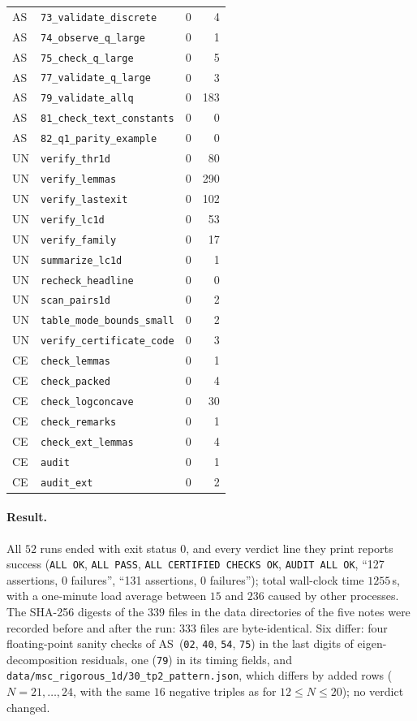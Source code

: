 \documentclass[10pt,a4paper]{article}
\theoremstyle{plain}
\theoremstyle{definition}
\newcommand{\ASY}{\textsf{AS}}
\newcommand{\UNI}{\textsf{UN}}
\newcommand{\CER}{\textsf{CE}}
\begin{document}
\begin{center}
\begin{longtable}{llrr}
\ASY & \texttt{73\_validate\_discrete} & 0 & 4\\
\ASY & \texttt{74\_observe\_q\_large} & 0 & 1\\
\ASY & \texttt{75\_check\_q\_large} & 0 & 5\\
\ASY & \texttt{77\_validate\_q\_large} & 0 & 3\\
\ASY & \texttt{79\_validate\_allq} & 0 & 183\\
\ASY & \texttt{81\_check\_text\_constants} & 0 & 0\\
\ASY & \texttt{82\_q1\_parity\_example} & 0 & 0\\
\UNI & \texttt{verify\_thr1d} & 0 & 80\\
\UNI & \texttt{verify\_lemmas} & 0 & 290\\
\UNI & \texttt{verify\_lastexit} & 0 & 102\\
\UNI & \texttt{verify\_lc1d} & 0 & 53\\
\UNI & \texttt{verify\_family} & 0 & 17\\
\UNI & \texttt{summarize\_lc1d} & 0 & 1\\
\UNI & \texttt{recheck\_headline} & 0 & 0\\
\UNI & \texttt{scan\_pairs1d} & 0 & 2\\
\UNI & \texttt{table\_mode\_bounds\_small} & 0 & 2\\
\UNI & \texttt{verify\_certificate\_code} & 0 & 3\\
\CER & \texttt{check\_lemmas} & 0 & 1\\
\CER & \texttt{check\_packed} & 0 & 4\\
\CER & \texttt{check\_logconcave} & 0 & 30\\
\CER & \texttt{check\_remarks} & 0 & 1\\
\CER & \texttt{check\_ext\_lemmas} & 0 & 4\\
\CER & \texttt{audit} & 0 & 1\\
\CER & \texttt{audit\_ext} & 0 & 2\\
\bottomrule
\end{longtable}
\end{center}

\paragraph{Result.} All $52$ runs ended with exit status $0$, and every verdict line they print reports success (\texttt{ALL OK}, \texttt{ALL PASS}, \texttt{ALL CERTIFIED CHECKS OK}, \texttt{AUDIT ALL OK}, ``127 assertions, 0 failures'', ``131 assertions, 0 failures''); total wall-clock time $1255$\,s, with a one-minute load average between $15$ and $236$ caused by other processes. The SHA-256 digests of the $339$ files in the data directories of the five notes were recorded before and after the run: $333$ files are byte-identical. Six differ: four floating-point sanity checks of \ASY\ (\texttt{02}, \texttt{40}, \texttt{54}, \texttt{75}) in the last digits of eigen-decomposition residuals, one (\texttt{79}) in its timing fields, and \texttt{data/msc\_rigorous\_1d/30\_tp2\_pattern.json}, which differs by added rows ($N=21,\dots,24$, with the same $16$ negative triples as for $12\le N\le20$); no verdict changed.
\end{document}
